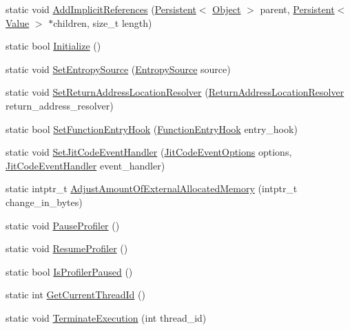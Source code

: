 \begin{DoxyCompactItemize}
\item 
static void \hyperlink{classv8_1_1_v8_a34e0158e2e7f0d1fa2641cba68ceac5b}{Add\+Implicit\+References} (\hyperlink{classv8_1_1_persistent}{Persistent}$<$ \hyperlink{classv8_1_1_object}{Object} $>$ parent, \hyperlink{classv8_1_1_persistent}{Persistent}$<$ \hyperlink{classv8_1_1_value}{Value} $>$ $\ast$children, size\+\_\+t length)
\item 
static bool \hyperlink{classv8_1_1_v8_a40daec93ce44bdd922567fc121be9db8}{Initialize} ()
\item 
static void \hyperlink{classv8_1_1_v8_a5331ce9c858af264f30de667c74c5a76}{Set\+Entropy\+Source} (\hyperlink{namespacev8_ab699f4bbbb56350e6e915682e420fcdc}{Entropy\+Source} source)
\item 
static void \hyperlink{classv8_1_1_v8_a7a9e8a96dcb3c3d306c0061b0a8e39c8}{Set\+Return\+Address\+Location\+Resolver} (\hyperlink{namespacev8_a8ce54c75241be41ff6a25e9944eefd2a}{Return\+Address\+Location\+Resolver} return\+\_\+address\+\_\+resolver)
\item 
static bool \hyperlink{classv8_1_1_v8_a3ec653c7112dc2f50675712e976b9d9c}{Set\+Function\+Entry\+Hook} (\hyperlink{namespacev8_aaf07fb6bb13f295da3c6568938b7dec5}{Function\+Entry\+Hook} entry\+\_\+hook)
\item 
static void \hyperlink{classv8_1_1_v8_abf1b71bf2e3cb73fa44c6939bd70ab5e}{Set\+Jit\+Code\+Event\+Handler} (\hyperlink{namespacev8_a06f34fa4fa4cfc8518366808d1d461c1}{Jit\+Code\+Event\+Options} options, \hyperlink{namespacev8_a39243bc91e63d64d111452fdb98c4733}{Jit\+Code\+Event\+Handler} event\+\_\+handler)
\item 
static intptr\+\_\+t \hyperlink{classv8_1_1_v8_ab9532c940926018bc1e88ed21662395f}{Adjust\+Amount\+Of\+External\+Allocated\+Memory} (intptr\+\_\+t change\+\_\+in\+\_\+bytes)
\item 
static void \hyperlink{classv8_1_1_v8_a5fefebea0cd37105837a9d267baf2e5c}{Pause\+Profiler} ()
\item 
static void \hyperlink{classv8_1_1_v8_ab0557aaba62c7fb253fe838003aa60af}{Resume\+Profiler} ()
\item 
static bool \hyperlink{classv8_1_1_v8_aa8dc5a7c3a059bb376882ac36b9df775}{Is\+Profiler\+Paused} ()
\item 
static int \hyperlink{classv8_1_1_v8_a6b73813e84728c2a91f61ef45e48d80c}{Get\+Current\+Thread\+Id} ()
\item 
static void \hyperlink{classv8_1_1_v8_af7d845e6f55eb76085d5ff3601780986}{Terminate\+Execution} (int thread\+\_\+id)
\item 

\end{DoxyCompactItemize}
